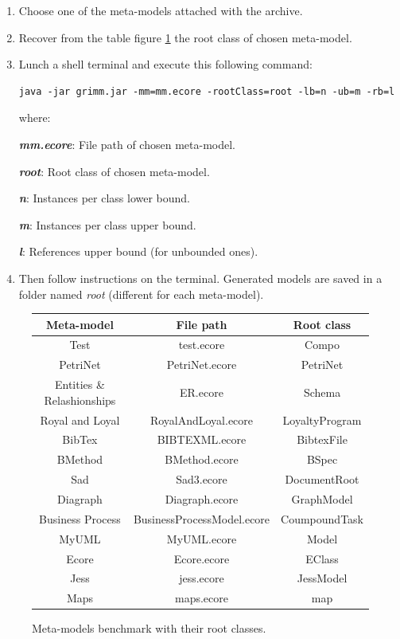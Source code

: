 \documentclass[12pt]{article} %
\begin{document}
\begin{enumerate}
\item Choose one of the meta-models attached with the archive.
\item Recover from the table figure \ref{test} the root class of chosen meta-model.
\item Lunch a shell terminal and execute this following command: 

\begin{verbatim}
java -jar grimm.jar -mm=mm.ecore -rootClass=root -lb=n -ub=m -rb=l
\end{verbatim}

where:

\textbf{\textit{mm.ecore}}: File path of chosen meta-model.

\textbf{\textit{root}}: Root class of chosen meta-model.

\textbf{\textit{n}}: Instances per class lower bound.

\textbf{\textit{m}}: Instances per class upper bound.

\textbf{\textit{l}}: References upper bound (for unbounded ones).

\item Then follow instructions on the terminal. Generated models are saved in a folder named \textit{root} (different for each meta-model).

\end{enumerate}

\begin{figure}[!h]
\centering
\begin{tabular}{c|c|c}
\hline
Meta-model & File path & Root class \\
\hline
Test & test.ecore & Compo  \\
PetriNet & PetriNet.ecore & PetriNet \\
Entities \& Relashionships & ER.ecore & Schema \\
Royal and Loyal & RoyalAndLoyal.ecore & LoyaltyProgram \\
BibTex & BIBTEXML.ecore & BibtexFile \\
BMethod & BMethod.ecore & BSpec \\
Sad & Sad3.ecore & DocumentRoot \\
Diagraph & Diagraph.ecore & GraphModel \\
Business Process & BusinessProcessModel.ecore & CoumpoundTask \\
MyUML & MyUML.ecore & Model \\
Ecore & Ecore.ecore & EClass \\
Jess & jess.ecore & JessModel \\
Maps & maps.ecore & map \\
\hline
\end{tabular}
\caption{Meta-models benchmark with their root classes.}
\label{test}
\end{figure}
\end{document}
